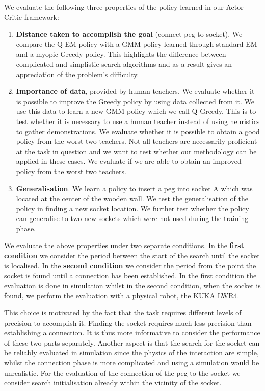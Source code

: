 We evaluate the following three properties of the policy learned in our Actor-Critic framework:
\begin{enumerate}
 \item \textbf{Distance taken to accomplish the goal} (connect peg to socket). We compare the Q-EM policy with 
 a GMM policy learned through standard EM and a myopic Greedy policy. This highlights the difference between complicated and simplistic  
  search algorithms and as a result gives an appreciation of the problem's difficulty.
 \item \textbf{Importance of data}, provided by human teachers. We evaluate whether it is possible to improve 
 the Greedy policy by using data collected from it. We use this data to learn a new GMM policy which we call 
 Q-Greedy. This is to test whether it is necessary to use a human teacher instead of using heuristics to 
 gather demonstrations.
 We evaluate whether it is possible to obtain a good policy from the worst two teachers. Not all teachers 
 are necessarily proficient at the task in question and we want to test whether our methodology can be applied in these
 cases. We evaluate if we  are able to obtain an improved policy from the worst two teachers.
 \item \textbf{Generalisation}. We learn a policy to insert a peg into socket A which was located at the center of the wooden 
 wall. We test the generalisation of the policy in finding a new socket location. We further test whether the policy can generalise to two new sockets 
 which were not used during the training phase.
\end{enumerate}

We evaluate the above properties under two separate conditions. In the \textbf{first condition} we consider the period between the start 
of the search until the socket is localised. In the \textbf{second condition} we consider the period from the point the socket is found until
a connection has been established. In the first condition the evaluation is done in simulation whilst 
in the second condition, when the socket is found, we perform the evaluation with a physical robot, the KUKA LWR4.

This choice is motivated by the fact that the task requires different levels of precision to accomplish it.
Finding the socket requires much less precision than establishing a connection. It is thus
more informative to consider the performance of these two parts separately.
Another aspect is that the search for the socket can be reliably evaluated in simulation since the physics of the interaction
are simple, whilst the connection phase is more complicated and using a simulation would be unrealistic.
For the evaluation of the connection of the peg to the socket we consider search initialisation already within 
the vicinity of the socket.

